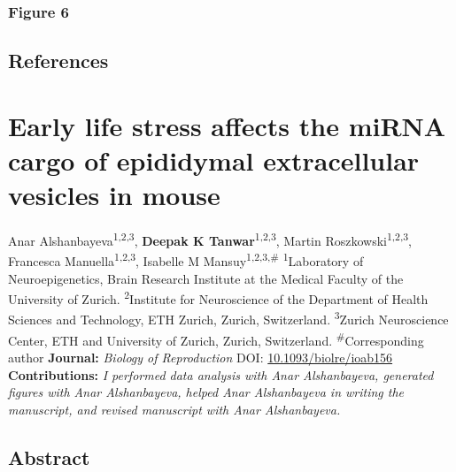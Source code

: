 \documentclass[12pt,twoside]{reedthesis}
\begin{document}
\hypertarget{figure-6}{%
\subsection{Figure 6}\label{figure-6}}

\newpage

\hypertarget{references}{%
\section{References}\label{references}}

\hypertarget{ev}{%
\chapter{Early life stress affects the miRNA cargo of epididymal extracellular vesicles in mouse}\label{ev}}

Anar Alshanbayeva\textsuperscript{1,2,3}, \textbf{Deepak K Tanwar}\textsuperscript{1,2,3}, Martin Roszkowski\textsuperscript{1,2,3}, Francesca Manuella\textsuperscript{1,2,3}, Isabelle M Mansuy\textsuperscript{1,2,3,\#}
\newline
\newline
\textsuperscript{1}Laboratory of Neuroepigenetics, Brain Research Institute at the Medical Faculty of the University of Zurich.
\newline
\textsuperscript{2}Institute for Neuroscience of the Department of Health Sciences and Technology, ETH Zurich, Zurich, Switzerland.
\newline
\textsuperscript{3}Zurich Neuroscience Center, ETH and University of Zurich, Zurich, Switzerland.
\newline
\newline
\textsuperscript{\#}Corresponding author
\newline
\newline
\textbf{Journal:} \emph{Biology of Reproduction}
\newline
DOI: \href{https://doi.org/10.1093/biolre/ioab156}{10.1093/biolre/ioab156}
\newline
\newline
\textbf{Contributions:} \emph{I performed data analysis with Anar Alshanbayeva, generated figures with Anar Alshanbayeva, helped Anar Alshanbayeva in writing the manuscript, and revised manuscript with Anar Alshanbayeva.}

\newpage

\hypertarget{abstract-2}{%
\section{Abstract}\label{abstract-2}}
\end{document}
